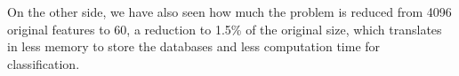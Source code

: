 \documentclass[12pt,a4paper,titlepage]{article}
\begin{document}
On the other side, we have also seen how much the problem is reduced from 4096 original features to 60, a reduction to 1.5\% of the original size, which translates in less memory to store the databases and less computation time for classification.


%
%
%
%
\end{document}
